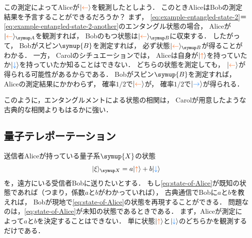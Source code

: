 \documentclass[
]{sotsu}
\newcommand{\bitone}{\mathcolor{fire}{\uparrow}}
\newcommand{\bittwo}{\mathcolor{water}{\downarrow}}
\newcommand{\bitthr}{\mathcolor{fire}{\leftarrow}}
\newcommand{\bitfou}{\mathcolor{water}{\rightarrow}}
\begin{document}
この測定によってAliceが$\ket{\bitthr}$を観測したとしよう．
このときAliceはBobの測定結果を予言することができるだろうか？\quad 
まず，
\cref{eq:example-entangled-state-2}＝\cref{eq:example-entangled-state-2-another}のエンタングル状態の場合，
Aliceが$\ket{\bitthr}<A>$を観測すれば，
Bobのもつ状態は$\ket{\bitthr}<B>$に収束する．
したがって，
Bobがスピン$\symup{B}$を測定すれば，
必ず状態$\ket{\bitthr}<B>$が得ることがわかる．
一方，
Carolのシチュエーションでは，
Aliceは自身が$\ket{\bitone}$を持っていたか$\ket{\bittwo}$を持っていたか知ることはできない．
どちらの状態を測定しても，
$\ket{\bitthr}$が得られる可能性があるからである．
Bobがスピン$\symup{B}$を測定すれば，
Aliceの測定結果にかかわらず，
確率$1/2$で$\ket{\bitthr}$が，
確率$1/2$で$\ket{\bitfou}$が得られる．

このように，エンタングルメントによる状態の相関は，
Carolが用意したような古典的な相関よりもはるかに強い．



\subsection{量子テレポーテーション}

送信者Aliceが持っている量子系$\symup{X}$の状態
\begin{equation}
    \label{eq:state-of-Alice}
    \ket{\xi}<X> = a \ket{\bitone} + b \ket{\bittwo}
\end{equation}
を，遠方にいる受信者Bobに送りたいとする．
もし\cref{eq:state-of-Alice}が既知の状態であれば（つまり，係数$a$と$b$がわかっていれば），
古典通信でBobに$a$と$b$を教えれば，
Bobが現地で\cref{eq:state-of-Alice}の状態を再現することができる．
問題なのは，\cref{eq:state-of-Alice}が未知の状態であるときである．
まず，Aliceが測定によって$a$と$b$を決定することはできない．
単に状態$\ket{\bitone}$と$\ket{\bittwo}$のどちらかを観測するだけである．
\end{document}
